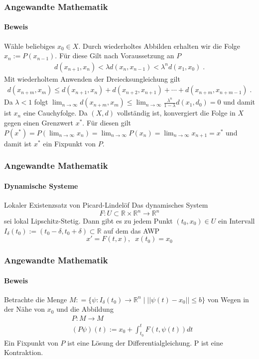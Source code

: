 \documentclass{beamer}
\begin{document}
\begin{frame}
    \frametitle{Angewandte Mathematik}
\framesubtitle{Beweis}
Wähle beliebiges $x_0 \in X$. Durch wiederholtes Abbilden erhalten wir die Folge  $x_n:= P(x_{n-1})$. Für diese Gilt nach Voraussetzung an $P$
\begin{align*}
d(x_{n+1} , x_{n}) < \lambda d(x_{n} , x_{n-1})   < \lambda^n d(x_{1} , x_{0})  \; .
\end{align*}
Mit wiederholtem Anwenden der Dreiecksungleichung gilt 
\begin{align*}
d(x_{n + m} , x_{ m}) \leq d(x_{n+1} , x_{n})  +  d(x_{n +2} , x_{n +1}) +   \cdots   +  d(x_{n + m } , x_{n +m -1}) \; .
\end{align*}
Da $\lambda < 1$ folgt $  \lim_{n \to \infty} d(x_{n + m} , x_{ m})   \leq  \lim_{n \to \infty} \frac{\lambda^n}{1 - \lambda} d(x_{1} , d_{0}) = 0$ und damit ist $x_n$ eine Cauchyfolge.  Da $(X,d)$ vollständig ist, konvergiert die Folge in $X$ gegen einen Grenzwert $x^*$. Für diesen gilt $P(x^*) =  P (  \lim_{n \to \infty}  x_n) =  \lim_{n \to \infty} P(x_n)  =  \lim_{n \to \infty} x_{n+1} = x^*$ und damit ist $x^*$ ein Fixpunkt von $P$.

 \end{frame}

\begin{frame}
    \frametitle{Angewandte Mathematik}
\framesubtitle{Dynamische Systeme }
\begin{block}{Lokaler Existenzsatz von Picard-Lindelöf}
Das dynamisches System  $$F : U \subset \mathbb{R} \times \mathbb{R}^n \to \mathbb{R}^n$$ sei lokal Lipschitz-Stetig. 
Dann gibt es zu jedem Punkt $(t_0, x_0) \in U$ ein Intervall $I_\delta (t_0) := (t_0 - \delta, t_0 + \delta) \subset \mathbb{R}$ auf dem das AWP 
$$ x' = F(t,x), \; \; x(t_0) = x_0$$
\end{block}

 \end{frame}

\begin{frame}
    \frametitle{Angewandte Mathematik}
\framesubtitle{Beweis}
Betrachte die Menge  $M: = \{ \psi : I_\delta (t_0) \to \mathbb{R}^n \; | \; ||\psi(t) - x_0 || \leq b  \}$ von Wegen in der Nähe von $x_0$ und die Abbildung
\begin{align*}
& P : M \to M \\
& (P \psi)(t) := x_0 + \int_{t_0}^{t} F(t, \psi(t)) dt
\end{align*}
Ein Fixpunkt von $P$ ist eine Lösung der Differentialgleichung. P ist eine Kontraktion.
 \end{frame}
\end{document}
